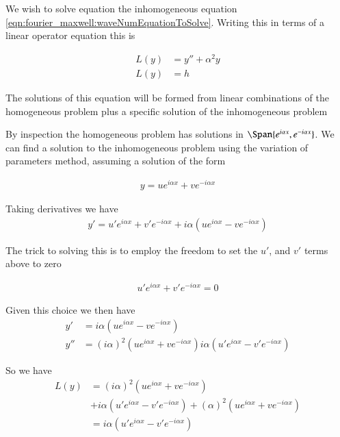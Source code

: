 We wish to solve equation the inhomogeneous equation \ref{eqn:fourier_maxwell:waveNumEquationToSolve}.  Writing this in terms of a linear operator equation this is

\begin{align*}
L(y) &= y'' + \alpha^2 y \\
L(y) &= h
\end{align*}

The solutions of this equation will be formed from linear combinations of the homogeneous problem plus a specific solution of the inhomogeneous problem

By inspection the homogeneous problem has solutions in $\Span \{ e^{ i \alpha x }, e^{ -i \alpha x }\}$.
We can find a solution to the inhomogeneous problem using the variation of parameters method, assuming a solution of the form

\begin{align*}
y  = u e^{ i \alpha x } + v e^{ -i \alpha x }
\end{align*}

Taking derivatives we have
\begin{align*}
y' = u' e^{ i \alpha x } + v' e^{ -i \alpha x } + i \alpha (u e^{ i \alpha x } - v e^{ -i \alpha x })
\end{align*}

The trick to solving this is to employ the freedom to set the $u'$, and $v'$ terms above to zero

\begin{align}\label{eqn:fourier_maxwell:firstConstraint}
u' e^{ i \alpha x } + v' e^{ -i \alpha x } = 0
\end{align}

Given this choice we then have
\begin{align*}
y' &= i \alpha (u e^{ i \alpha x } - v e^{ -i \alpha x }) \\
y'' &=
(i \alpha)^2 (u e^{ i \alpha x } + v e^{ -i \alpha x })
i \alpha (u' e^{ i \alpha x } - v' e^{ -i \alpha x })
\end{align*}

So we have
\begin{align*}
L(y)
&=
(i \alpha)^2 (u e^{ i \alpha x } + v e^{ -i \alpha x })  \\
&+i \alpha (u' e^{ i \alpha x } - v' e^{ -i \alpha x })
+ (\alpha)^2 (u e^{ i \alpha x } + v e^{ -i \alpha x })  \\
&=
i \alpha (u' e^{ i \alpha x } - v' e^{ -i \alpha x })
\end{align*}

